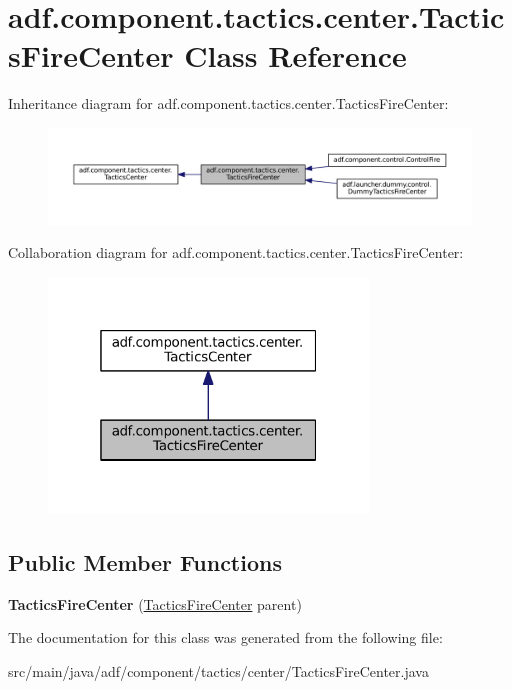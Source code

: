 \hypertarget{classadf_1_1component_1_1tactics_1_1center_1_1TacticsFireCenter}{}\section{adf.\+component.\+tactics.\+center.\+Tactics\+Fire\+Center Class Reference}
\label{classadf_1_1component_1_1tactics_1_1center_1_1TacticsFireCenter}


Inheritance diagram for adf.\+component.\+tactics.\+center.\+Tactics\+Fire\+Center\+:
\nopagebreak
\begin{figure}[H]
\begin{center}
\leavevmode
\includegraphics[width=350pt]{classadf_1_1component_1_1tactics_1_1center_1_1TacticsFireCenter__inherit__graph}
\end{center}
\end{figure}


Collaboration diagram for adf.\+component.\+tactics.\+center.\+Tactics\+Fire\+Center\+:
\nopagebreak
\begin{figure}[H]
\begin{center}
\leavevmode
\includegraphics[width=241pt]{classadf_1_1component_1_1tactics_1_1center_1_1TacticsFireCenter__coll__graph}
\end{center}
\end{figure}
\subsection*{Public Member Functions}
\begin{DoxyCompactItemize}
\item 
\hypertarget{classadf_1_1component_1_1tactics_1_1center_1_1TacticsFireCenter_afc4ba6e95115a12f3a593ba067b1e2d3}{}\label{classadf_1_1component_1_1tactics_1_1center_1_1TacticsFireCenter_afc4ba6e95115a12f3a593ba067b1e2d3} 
{\bfseries Tactics\+Fire\+Center} (\hyperlink{classadf_1_1component_1_1tactics_1_1center_1_1TacticsFireCenter}{Tactics\+Fire\+Center} parent)
\end{DoxyCompactItemize}


The documentation for this class was generated from the following file\+:\begin{DoxyCompactItemize}
\item 
src/main/java/adf/component/tactics/center/Tactics\+Fire\+Center.\+java\end{DoxyCompactItemize}
